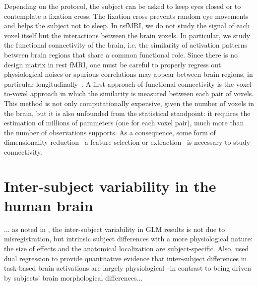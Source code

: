 Depending on the protocol, the subject can be asked to keep eyes closed or
to contemplate a fixation cross. The fixation cross prevents random eye movements
and helps the subject not to sleep.
In rsfMRI, we do not study the signal of each voxel itself but the
interactions between the brain voxels. In particular, we study the functional
connectivity of the brain, i.e. the similarity of activation patterns between
brain regions that share a common functional role. Since there is no design
matrix in rest fMRI, one must be careful to properly regress out physiological
noises or spurious correlations may appear between brain regions, in particular
longitudinally~\citep{power2012,vandijk2012}.
A first approach of functional connectivity is the voxel-to-voxel approach in
which the similarity is measured between each pair of voxels. This method is
not only computationally expensive, given the number of voxels in the brain,
but it is also unfounded from the statistical standpoint: it requires the
estimation of millions of parameters (one for each voxel pair), much more than the number of observations
supports. As a consequence, some form of dimensionality reduction --a feature
selection or extraction-- is necessary to study connectivity.



\section{Inter-subject variability in the human brain}
... as noted in
\citep{thirion2007analysis,pmid22425669}, the inter-subject variability
in GLM results is not due to misregistration, but intrinsic subject
differences with a more physiological nature: the size of effects and
the anatomical localization are subject-specific. Also, \citep{tavor2016task} used
dual regression \citep{Filippini2009} to provide quantitative evidence that inter-subject
differences in task-based brain activations are largely physiological --in contrast to being driven
by subjects' brain morphological differences...


